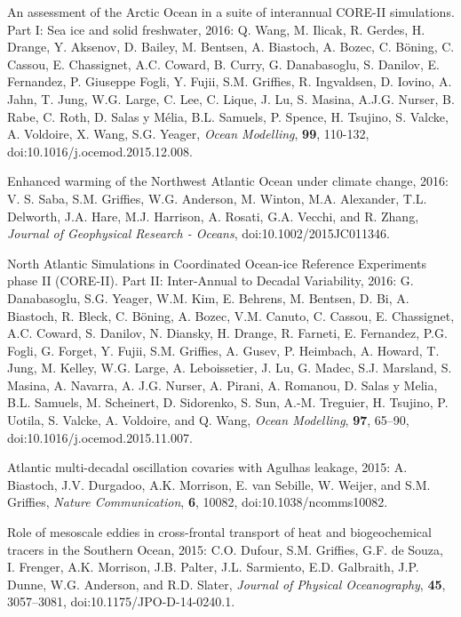 \begin{etaremune}
\item An assessment of the Arctic Ocean in a suite of interannual
  CORE-II simulations. Part I: Sea ice and solid freshwater, 2016:
  Q. Wang, M. Ilicak, R. Gerdes, H. Drange, Y. Aksenov, D. Bailey,
  M. Bentsen, A. Biastoch, A. Bozec, C. B\"{o}ning, C.  Cassou,
  E. Chassignet, A.C. Coward, B. Curry, G. Danabasoglu, S. Danilov,
  E. Fernandez, P. Giuseppe Fogli, Y. Fujii, S.M. Grif\/f\/ies,
  R. Ingvaldsen, D. Iovino, A. Jahn, T. Jung, W.G. Large, C. Lee,
  C. Lique, J. Lu, S. Masina, A.J.G. Nurser, B. Rabe, C. Roth,
  D. Salas y M\'elia, B.L. Samuels, P. Spence, H. Tsujino, S. Valcke,  A. Voldoire, X. Wang, S.G. Yeager, {\it Ocean Modelling}, {\bf 99}, 110-132, doi:10.1016/j.ocemod.2015.12.008.

\item Enhanced warming of the Northwest Atlantic Ocean under climate
  change, 2016: V. S. Saba, S.M. Grif\/f\/ies, W.G. Anderson,
  M. Winton, M.A. Alexander, T.L. Delworth, J.A. Hare, M.J. Harrison, A. Rosati, G.A. Vecchi, and R. Zhang, {\it Journal of Geophysical Research - Oceans}, doi:10.1002/2015JC011346.

\item North Atlantic Simulations in Coordinated Ocean-ice Reference
  Experiments phase II (CORE-II). Part II: Inter-Annual to Decadal
  Variability, 2016: G. Danabasoglu, S.G. Yeager, W.M. Kim,
  E. Behrens, M. Bentsen, D. Bi, A. Biastoch, R. Bleck, C. B\"{o}ning,  A. Bozec, V.M. Canuto, C. Cassou, E. Chassignet, A.C. Coward, S. Danilov, N. Diansky, H. Drange, R. Farneti, E. Fernandez, P.G. Fogli, G. Forget, Y. Fujii, S.M. Grif\/f\/ies, A. Gusev, P. Heimbach, A. Howard, T. Jung, M. Kelley, W.G. Large,
  A. Leboissetier, J. Lu, G. Madec, S.J. Marsland, S. Masina,
  A. Navarra, A. J.G. Nurser, A. Pirani, A. Romanou, D. Salas y Melia, B.L. Samuels, M. Scheinert, D. Sidorenko, S. Sun, A.-M. Treguier, H. Tsujino, P. Uotila, S. Valcke, A. Voldoire, and Q. Wang, {\it Ocean Modelling}, {\bf 97}, 65--90, 
doi:10.1016/j.ocemod.2015.11.007.

\item Atlantic multi-decadal oscillation covaries with Agulhas leakage, 2015: A. Biastoch, J.V. Durgadoo, A.K. Morrison, E. van Sebille, W. Weijer, and S.M. Grif\/f\/ies, {\it Nature Communication}, {\bf 6}, 10082, doi:10.1038/ncomms10082.

\item Role of mesoscale eddies in cross-frontal transport of heat and biogeochemical tracers in the Southern Ocean, 2015: C.O. Dufour, S.M. Grif\/f\/ies, G.F. de Souza, I. Frenger, A.K. Morrison, J.B. Palter, J.L. Sarmiento, E.D. Galbraith, J.P. Dunne, W.G. Anderson, and R.D. Slater, {\it Journal of Physical Oceanography}, {\bf 45}, 3057--3081,
doi:10.1175/JPO-D-14-0240.1.


\end{etaremune}
